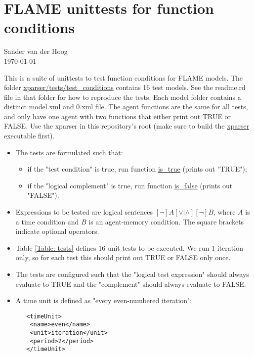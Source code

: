 \documentclass[11pt,a4paper]{article}
\begin{document}
\section{FLAME unittests for function conditions}
Sander van der Hoog\\
\today

This is a suite of unittests to test function conditions for FLAME models.
The folder \url{xparser/tests/test_conditions} contains 16 test models. 
See the readme.rd file in that folder for how to reproduce the tests. 
Each model folder contains a distinct \url{model.xml} and \url{0.xml} file.
The agent functions are the same for all tests, and only have one agent with two functions that either print out TRUE or FALSE.
Use the xparser in this repository's root (make sure to build the \url{xparser} executable first).


\bigskip
\begin{itemize}
\item The tests are formulated such that:
\begin{itemize}
\item if the "test condition" is true, run function \url{is_true} (prints out "TRUE");
\item if the "logical complement" is true, run function \url{is_false} (prints out "FALSE").
\end{itemize}

\item Expressions to be tested are logical sentences $[\neg]A [\lor|\land] [\neg]B$, where $A$ is a time condition and $B$ is an agent-memory condition.
The square brackets indicate optional operators.

\item Table \ref{Table: tests} defines 16 unit tests to be executed. We run 1 iteration only, so for each test this should print out TRUE or FALSE only once.

\item The tests are configured such that the "logical test expression" should always evaluate to TRUE and the "complement" should always evaluate to FALSE.

\item A time unit is defined as "every even-numbered iteration":

\smallskip
\begin{boxedminipage}{7cm}
\begin{lstlisting}
   <timeUnit>
    <name>even</name>
    <unit>iteration</unit>
    <period>2</period>
   </timeUnit>
\end{lstlisting}
\end{boxedminipage}
\end{itemize}
\end{document}
